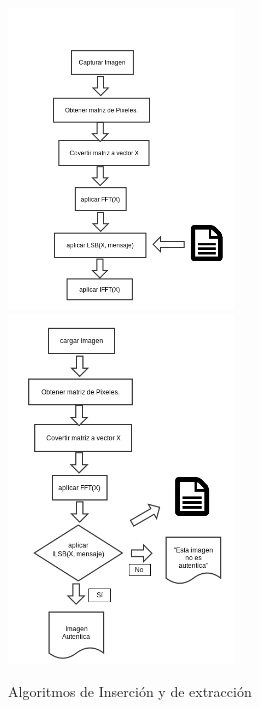 \documentclass[12pt]{article}
\begin{document}
\begin{figure}[hbtp]
\centering
\includegraphics[width = 6cm]{algoritmoInsercion.png}
\includegraphics[width = 6cm]{algoritmoExtraccion.png}
\caption{Algoritmos de Inserción y de extracción}
\end{figure}
\newline
\end{document}
